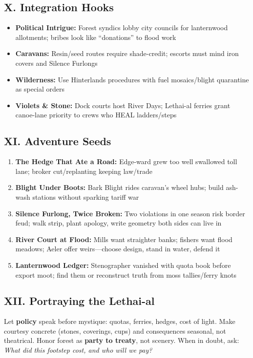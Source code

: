 \documentclass[11pt]{book}
\begin{document}
\subsection{X. Integration Hooks}
\begin{itemize}
    \item \textbf{Political Intrigue:} Forest syndics lobby city councils for lanternwood allotments; bribes look like ``donations'' to flood work
    \item \textbf{Caravans:} Resin/seed routes require shade-credit; escorts must mind iron covers and Silence Furlongs
    \item \textbf{Wilderness:} Use Hinterlands procedures with fuel mosaics/blight quarantine as special orders
    \item \textbf{Violets \& Stone:} Dock courts host River Days; Lethai-al ferries grant canoe-lane priority to crews who HEAL ladders/steps
\end{itemize}

\subsection{XI. Adventure Seeds}
\begin{enumerate}
    \item \textbf{The Hedge That Ate a Road:} Edge-ward grew too well swallowed toll lane; broker cut/replanting keeping law/trade
    \item \textbf{Blight Under Boots:} Bark Blight rides caravan's wheel hubs; build ash-wash stations without sparking tariff war
    \item \textbf{Silence Furlong, Twice Broken:} Two violations in one season risk border feud; walk strip, plant apology, write geometry both sides can live in
    \item \textbf{River Court at Flood:} Mills want straighter banks; fishers want flood meadows; Aeler offer weirs---choose design, stand in water, defend it
    \item \textbf{Lanternwood Ledger:} Stenographer vanished with quota book before export moot; find them or reconstruct truth from moss tallies/ferry knots
\end{enumerate}

\subsection{XII. Portraying the Lethai-al}
Let \textbf{policy} speak before mystique: quotas, ferries, hedges, cost of light. Make courtesy concrete (stones, coverings, cups) and consequences seasonal, not theatrical. Honor forest as \textbf{party to treaty}, not scenery. When in doubt, ask: \emph{What did this footstep cost, and who will we pay?}
\end{document}
